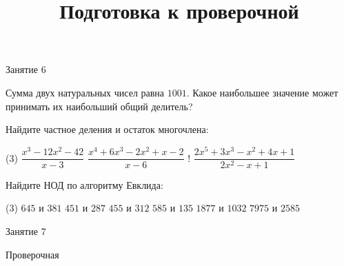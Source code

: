 \begin{class}[number=6]
	\begin{listofex}
		\item Занятие 6
	\end{listofex}
\end{class}

\begin{homework}[number=3]
	\begin{listofex}
		\item Сумма двух натуральных чисел равна \( 1001 \). Какое наибольшее значение может принимать их наибольший общий делитель?
		\item Найдите частное деления и остаток многочлена:
		\begin{tasks}(3)
			\task \( \dfrac{x^3-12x^2-42}{x-3} \)
			\task \( \dfrac{x^4+6x^3-2x^2+x-2}{x-6} \)
			\task! \( \dfrac{2x^5+3x^3-x^2+4x+1}{2x^2-x+1} \)
		\end{tasks}
		\item Найдите НОД по алгоритму Евклида:
		\begin{tasks}(3)
			\task \( 645 \) и \( 381 \)
			\task \( 451 \) и \( 287 \)
			\task \( 455 \) и \( 312 \)
			\task \( 585 \) и \( 135 \)
			\task \( 1877 \) и \( 1032 \)
			\task \( 7975 \) и \( 2585 \)
		\end{tasks}
	\end{listofex}
\end{homework}

\begin{class}[number=7]
	\title{Подготовка к проверочной}
	\begin{listofex}
		\item Занятие 7
	\end{listofex}
\end{class}

\begin{exam}
	\begin{listofex}
		\item Проверочная
	\end{listofex}
\end{exam}

